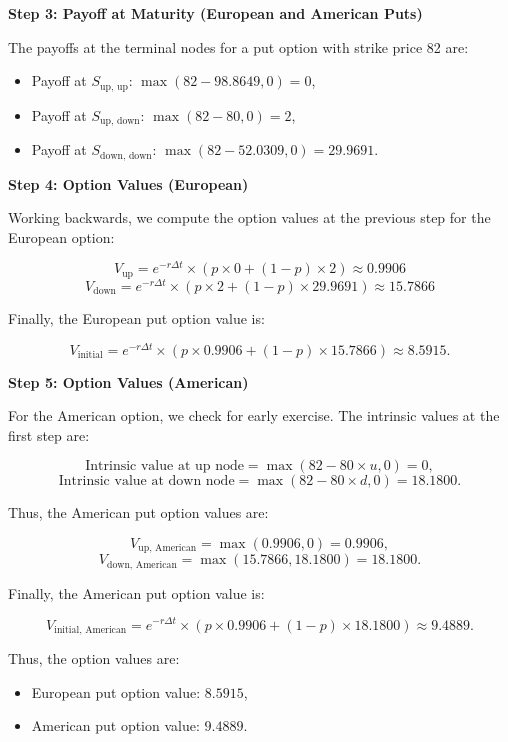 \documentclass[12pt,letterpaper, onecolumn]{exam}
\begin{document}
\begin{solution}
\textbf{Step 3: Payoff at Maturity (European and American Puts)}

The payoffs at the terminal nodes for a put option with strike price 82 are:
\begin{itemize}
    \item Payoff at \( S_{\text{up, up}} \): \( \max(82 - 98.8649, 0) = 0 \),
    \item Payoff at \( S_{\text{up, down}} \): \( \max(82 - 80, 0) = 2 \),
    \item Payoff at \( S_{\text{down, down}} \): \( \max(82 - 52.0309, 0) = 29.9691 \).
\end{itemize}

\textbf{Step 4: Option Values (European)}

Working backwards, we compute the option values at the previous step for the European option:

\[
V_{\text{up}} = e^{-r \Delta t} \times (p \times 0 + (1 - p) \times 2) \approx 0.9906
\]
\[
V_{\text{down}} = e^{-r \Delta t} \times (p \times 2 + (1 - p) \times 29.9691) \approx 15.7866
\]

Finally, the European put option value is:

\[
V_{\text{initial}} = e^{-r \Delta t} \times (p \times 0.9906 + (1 - p) \times 15.7866) \approx 8.5915.
\]

\textbf{Step 5: Option Values (American)}

For the American option, we check for early exercise. The intrinsic values at the first step are:

\[
\text{Intrinsic value at up node} = \max(82 - 80 \times u, 0) = 0,
\]
\[
\text{Intrinsic value at down node} = \max(82 - 80 \times d, 0) = 18.1800.
\]

Thus, the American put option values are:

\[
V_{\text{up, American}} = \max(0.9906, 0) = 0.9906,
\]
\[
V_{\text{down, American}} = \max(15.7866, 18.1800) = 18.1800.
\]

Finally, the American put option value is:

\[
V_{\text{initial, American}} = e^{-r \Delta t} \times (p \times 0.9906 + (1 - p) \times 18.1800) \approx 9.4889.
\]

Thus, the option values are:
\begin{itemize}
    \item European put option value: \( \boxed{8.5915} \),
    \item American put option value: \( \boxed{9.4889} \).
\end{itemize}

\end{solution}
\end{document}
